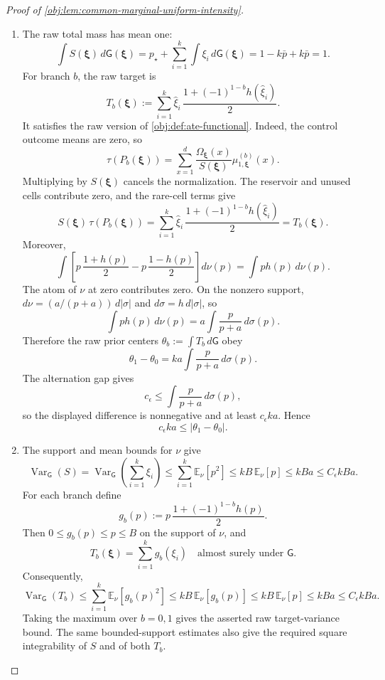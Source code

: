 \documentclass[11pt]{article}
\begin{document}
\begin{proof}[Proof of \cref{obj:lem:common-marginal-uniform-intensity}]
\begin{enumerate}
\item The raw total mass has mean one:
\[
\int S(\boldsymbol\xi)\,d\mathsf G(\boldsymbol\xi)
=
p_\star+\sum_{i=1}^k\int \xi_i\,d\mathsf G(\boldsymbol\xi)
=
1-k\bar p+k\bar p
=
1 .
\]
For branch \(b\), the raw target is
\[
T_b(\boldsymbol\xi)
:=
\sum_{i=1}^k
\widehat\xi_i\,
\frac{1+(-1)^{1-b}h(\widehat\xi_i)}2 .
\]
It satisfies the raw version of \cref{obj:def:ate-functional}. Indeed, the control outcome means are zero, so
\[
\tau(P_b(\boldsymbol\xi))
=\sum_{x=1}^d
\frac{\Omega_{\boldsymbol\xi}(x)}{S(\boldsymbol\xi)}
\mu_{1,\boldsymbol\xi}^{(b)}(x).
\]
Multiplying by \(S(\boldsymbol\xi)\) cancels the normalization. The reservoir and unused cells contribute zero, and the rare-cell terms give
\[
S(\boldsymbol\xi)\,\tau(P_b(\boldsymbol\xi))
=
\sum_{i=1}^k
\widehat\xi_i\,
\frac{1+(-1)^{1-b}h(\widehat\xi_i)}2
=T_b(\boldsymbol\xi).
\]
Moreover,
\[
\int
\left[
p\,\frac{1+h(p)}2
-
p\,\frac{1-h(p)}2
\right]d\nu(p)
=
\int p h(p)\,d\nu(p).
\]
The atom of \(\nu\) at zero contributes zero. On the nonzero support, \(d\nu=(a/(p+a))\,d|\sigma|\) and \(d\sigma=h\,d|\sigma|\), so
\[
\int p h(p)\,d\nu(p)
=
a\int \frac{p}{p+a}\,d\sigma(p).
\]
Therefore the raw prior centers \(\theta_b:=\int T_b\,d\mathsf G\) obey
\[
\theta_1-\theta_0
=
k a\int \frac{p}{p+a}\,d\sigma(p).
\]
The alternation gap gives
\[
c_\epsilon\le \int \frac{p}{p+a}\,d\sigma(p),
\]
so the displayed difference is nonnegative and at least \(c_\epsilon k a\). Hence
\[
c_\epsilon k a\le |\theta_1-\theta_0|.
\]

\item The support and mean bounds for \(\nu\) give
\[
\operatorname{Var}_{\mathsf G}(S)
=
\operatorname{Var}_{\mathsf G}\left(\sum_{i=1}^k\xi_i\right)
\le
\sum_{i=1}^k\mathbb E_\nu[p^2]
\le
kB\,\mathbb E_\nu[p]
\le
kBa
\le C_\epsilon kBa .
\]
For each branch define
\[
g_b(p):=
p\,\frac{1+(-1)^{1-b}h(p)}2 .
\]
Then \(0\le g_b(p)\le p\le B\) on the support of \(\nu\), and
\[
T_b(\boldsymbol\xi)=\sum_{i=1}^k g_b(\xi_i)
\quad\text{almost surely under }\mathsf G .
\]
Consequently,
\[
\operatorname{Var}_{\mathsf G}(T_b)
\le
\sum_{i=1}^k\mathbb E_\nu[g_b(p)^2]
\le
kB\,\mathbb E_\nu[g_b(p)]
\le
kB\,\mathbb E_\nu[p]
\le
kBa
\le
C_\epsilon kBa .
\]
Taking the maximum over \(b=0,1\) gives the asserted raw target-variance bound. The same bounded-support estimates also give the required square integrability of \(S\) and of both \(T_b\). %


\end{enumerate}
\end{proof}
\end{document}
